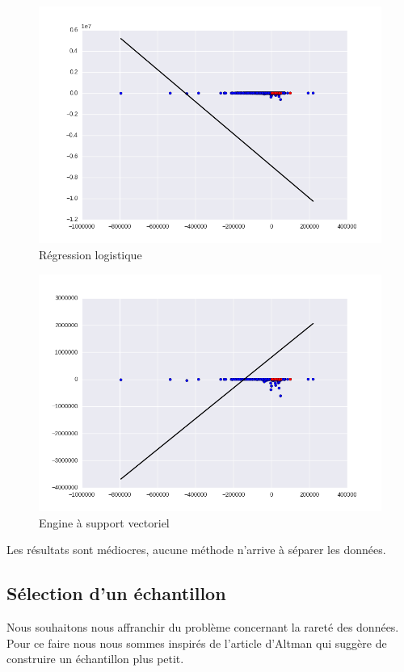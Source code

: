 \documentclass[DIV=calc, paper=a4, fontsize=11pt, twocolumn]{scrartcl}
\begin{document}
\begin{figure}
  \centering
    \includegraphics[width=\linewidth]{elog}
  \caption{Régression logistique}
  \label{fig:elog}
\end{figure}
\begin{figure}
  \centering
    \includegraphics[width=\linewidth]{esvm}
  \caption{Engine à support vectoriel}
  \label{fig:esvm}
\end{figure}

Les résultats sont médiocres, aucune méthode n'arrive à séparer les données. 

\subsection{Sélection d'un échantillon}
Nous souhaitons nous affranchir du problème concernant la rareté des données. Pour ce faire nous nous sommes inspirés de l'article d'Altman qui suggère de construire un échantillon plus petit. 
\end{document}
